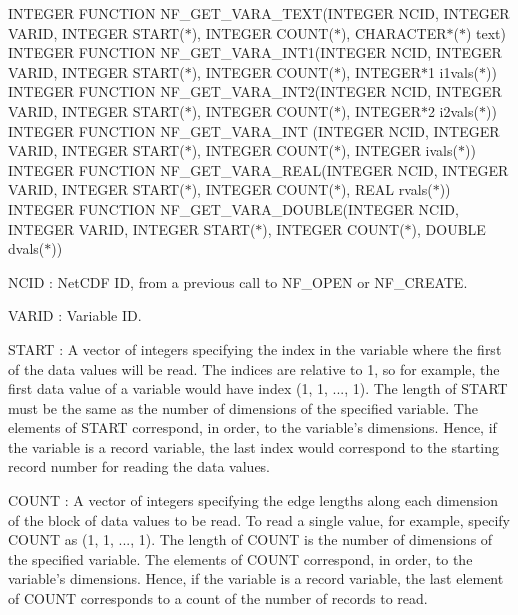 I\+N\+T\+E\+G\+ER F\+U\+N\+C\+T\+I\+ON N\+F\+\_\+\+G\+E\+T\+\_\+\+V\+A\+R\+A\+\_\+\+T\+E\+XT(I\+N\+T\+E\+G\+ER N\+C\+ID, I\+N\+T\+E\+G\+ER V\+A\+R\+ID, I\+N\+T\+E\+G\+ER S\+T\+A\+R\+T($\ast$), I\+N\+T\+E\+G\+ER C\+O\+U\+N\+T($\ast$), C\+H\+A\+R\+A\+C\+T\+E\+R$\ast$($\ast$) text) I\+N\+T\+E\+G\+ER F\+U\+N\+C\+T\+I\+ON N\+F\+\_\+\+G\+E\+T\+\_\+\+V\+A\+R\+A\+\_\+\+I\+N\+T1(I\+N\+T\+E\+G\+ER N\+C\+ID, I\+N\+T\+E\+G\+ER V\+A\+R\+ID, I\+N\+T\+E\+G\+ER S\+T\+A\+R\+T($\ast$), I\+N\+T\+E\+G\+ER C\+O\+U\+N\+T($\ast$), I\+N\+T\+E\+G\+E\+R$\ast$1 i1vals($\ast$)) I\+N\+T\+E\+G\+ER F\+U\+N\+C\+T\+I\+ON N\+F\+\_\+\+G\+E\+T\+\_\+\+V\+A\+R\+A\+\_\+\+I\+N\+T2(I\+N\+T\+E\+G\+ER N\+C\+ID, I\+N\+T\+E\+G\+ER V\+A\+R\+ID, I\+N\+T\+E\+G\+ER S\+T\+A\+R\+T($\ast$), I\+N\+T\+E\+G\+ER C\+O\+U\+N\+T($\ast$), I\+N\+T\+E\+G\+E\+R$\ast$2 i2vals($\ast$)) I\+N\+T\+E\+G\+ER F\+U\+N\+C\+T\+I\+ON N\+F\+\_\+\+G\+E\+T\+\_\+\+V\+A\+R\+A\+\_\+\+I\+NT (I\+N\+T\+E\+G\+ER N\+C\+ID, I\+N\+T\+E\+G\+ER V\+A\+R\+ID, I\+N\+T\+E\+G\+ER S\+T\+A\+R\+T($\ast$), I\+N\+T\+E\+G\+ER C\+O\+U\+N\+T($\ast$), I\+N\+T\+E\+G\+ER ivals($\ast$)) I\+N\+T\+E\+G\+ER F\+U\+N\+C\+T\+I\+ON N\+F\+\_\+\+G\+E\+T\+\_\+\+V\+A\+R\+A\+\_\+\+R\+E\+AL(I\+N\+T\+E\+G\+ER N\+C\+ID, I\+N\+T\+E\+G\+ER V\+A\+R\+ID, I\+N\+T\+E\+G\+ER S\+T\+A\+R\+T($\ast$), I\+N\+T\+E\+G\+ER C\+O\+U\+N\+T($\ast$), R\+E\+AL rvals($\ast$)) I\+N\+T\+E\+G\+ER F\+U\+N\+C\+T\+I\+ON N\+F\+\_\+\+G\+E\+T\+\_\+\+V\+A\+R\+A\+\_\+\+D\+O\+U\+B\+LE(I\+N\+T\+E\+G\+ER N\+C\+ID, I\+N\+T\+E\+G\+ER V\+A\+R\+ID, I\+N\+T\+E\+G\+ER S\+T\+A\+R\+T($\ast$), I\+N\+T\+E\+G\+ER C\+O\+U\+N\+T($\ast$), D\+O\+U\+B\+LE dvals($\ast$))

{\ttfamily N\+C\+ID} \+: Net\+C\+DF ID, from a previous call to N\+F\+\_\+\+O\+P\+EN or N\+F\+\_\+\+C\+R\+E\+A\+TE.

{\ttfamily V\+A\+R\+ID} \+: Variable ID.

{\ttfamily S\+T\+A\+RT} \+: A vector of integers specifying the index in the variable where the first of the data values will be read. The indices are relative to 1, so for example, the first data value of a variable would have index (1, 1, ..., 1). The length of S\+T\+A\+RT must be the same as the number of dimensions of the specified variable. The elements of S\+T\+A\+RT correspond, in order, to the variable’s dimensions. Hence, if the variable is a record variable, the last index would correspond to the starting record number for reading the data values.

{\ttfamily C\+O\+U\+NT} \+: A vector of integers specifying the edge lengths along each dimension of the block of data values to be read. To read a single value, for example, specify C\+O\+U\+NT as (1, 1, ..., 1). The length of C\+O\+U\+NT is the number of dimensions of the specified variable. The elements of C\+O\+U\+NT correspond, in order, to the variable’s dimensions. Hence, if the variable is a record variable, the last element of C\+O\+U\+NT corresponds to a count of the number of records to read.

